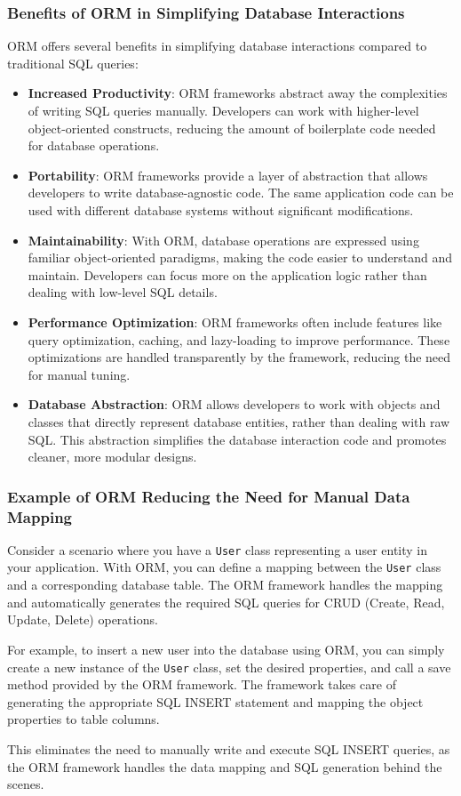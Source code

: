 \documentclass{article}
\begin{document}
\subsubsection*{Benefits of ORM in Simplifying Database Interactions}
ORM offers several benefits in simplifying database interactions compared to traditional SQL queries:
\begin{itemize}
  \item \textbf{Increased Productivity}: ORM frameworks abstract away the complexities of writing SQL queries manually. Developers can work with higher-level object-oriented constructs, reducing the amount of boilerplate code needed for database operations.
  \item \textbf{Portability}: ORM frameworks provide a layer of abstraction that allows developers to write database-agnostic code. The same application code can be used with different database systems without significant modifications.
  \item \textbf{Maintainability}: With ORM, database operations are expressed using familiar object-oriented paradigms, making the code easier to understand and maintain. Developers can focus more on the application logic rather than dealing with low-level SQL details.
  \item \textbf{Performance Optimization}: ORM frameworks often include features like query optimization, caching, and lazy-loading to improve performance. These optimizations are handled transparently by the framework, reducing the need for manual tuning.
  \item \textbf{Database Abstraction}: ORM allows developers to work with objects and classes that directly represent database entities, rather than dealing with raw SQL. This abstraction simplifies the database interaction code and promotes cleaner, more modular designs.
\end{itemize}

\subsubsection*{Example of ORM Reducing the Need for Manual Data Mapping}
Consider a scenario where you have a \texttt{User} class representing a user entity in your application. With ORM, you can define a mapping between the \texttt{User} class and a corresponding database table. The ORM framework handles the mapping and automatically generates the required SQL queries for CRUD (Create, Read, Update, Delete) operations.

For example, to insert a new user into the database using ORM, you can simply create a new instance of the \texttt{User} class, set the desired properties, and call a save method provided by the ORM framework. The framework takes care of generating the appropriate SQL INSERT statement and mapping the object properties to table columns.

This eliminates the need to manually write and execute SQL INSERT queries, as the ORM framework handles the data mapping and SQL generation behind the scenes.
\end{document}

